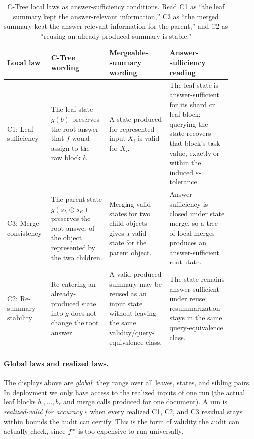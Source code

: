 \begin{table}[t]
\centering
\scriptsize
\setlength{\tabcolsep}{3pt}
\begin{tabular}{@{}p{0.16\linewidth}p{0.24\linewidth}p{0.25\linewidth}p{0.25\linewidth}@{}}
\toprule
Local law & C-Tree wording & Mergeable-summary wording & Answer-sufficiency reading \\
\midrule
C1: Leaf sufficiency &
The leaf state \(g(b)\) preserves the root answer that \(f\) would assign to the
raw block \(b\). &
A state produced for represented input \(X_i\) is valid for \(X_i\). &
The leaf state is answer-sufficient for its shard or leaf block: querying the
state recovers that block's task value, exactly or within the induced
\(\varepsilon\)-tolerance. \\
C3: Merge consistency &
The parent state \(g(s_L\oplus s_R)\) preserves the root answer of the object
represented by the two children. &
Merging valid states for two child objects gives a valid state for the
parent object. &
Answer-sufficiency is closed under state merge, so a tree of local merges
produces an answer-sufficient root state. \\
C2: Re-summary stability &
Re-entering an already-produced state into \(g\) does not change the root
answer. &
A valid produced summary may be reused as an input state without leaving the
same validity/query-equivalence class. &
The state remains answer-sufficient under reuse: resummarization stays in the
same query-equivalence class. \\
\bottomrule
\end{tabular}
\caption{C-Tree local laws as answer-sufficiency conditions. Read C1 as
``the leaf summary kept the answer-relevant information,'' C3 as ``the merged
summary kept the answer-relevant information for the parent,'' and C2 as
``reusing an already-produced summary is stable.''}
\label{tab:v7-local-laws-sketch-link}
\end{table}

\paragraph{Global laws and realized laws.}
The displays above are \emph{global}: they range over all leaves,
states, and sibling pairs. In deployment we only have access to the
realized inputs of one run (the actual leaf blocks
\(b_1,\dots,b_\ell\) and merge calls produced for one document). A run is
\emph{realized-valid for accuracy \(\varepsilon\)} when every realized
C1, C2, and C3 residual stays within bounds the audit can certify.
This is the form of validity the audit can actually check, since
\(f^\ast\) is too expensive to run universally.


